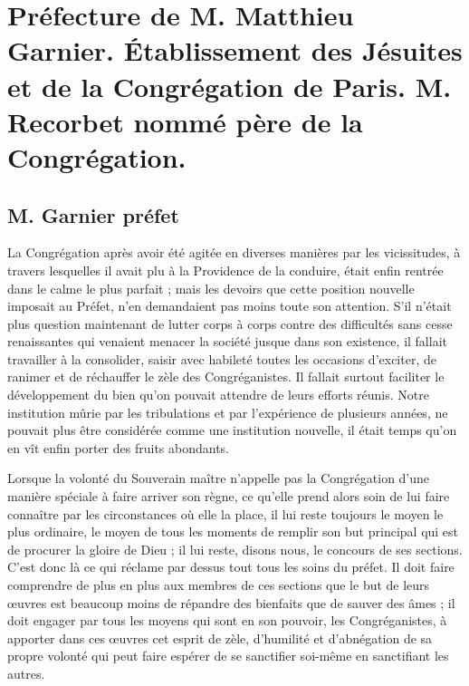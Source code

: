 \chapter{Préfecture de M. Matthieu Garnier. Établissement des Jésuites et de la Congrégation de Paris. M. Recorbet nommé père de la Congrégation.}

\section*{M. Garnier préfet}
La Congrégation après avoir été agitée en diverses manières par les vicissitudes, à travers lesquelles il avait plu à la Providence de la conduire, était enfin rentrée dans le calme le plus parfait ; mais les devoirs que cette position nouvelle imposait au Préfet, n'en demandaient pas moins toute son attention. S'il n'était plus question maintenant de lutter corps à corps contre des difficultés sans cesse renaissantes qui venaient menacer la société jusque dans son existence, il fallait travailler à la consolider, saisir avec habileté toutes les occasions d'exciter, de ranimer et de réchauffer le zèle des Congréganistes. Il fallait surtout faciliter le développement du bien qu'on pouvait attendre de leurs efforts réunis. Notre institution mûrie par les tribulations et par l'expérience de plusieurs années, ne pouvait plus être considérée comme une institution nouvelle, il était temps qu'on en vît enfin porter des fruits abondants.

Lorsque la volonté du Souverain maître n'appelle pas la Congrégation d'une manière spéciale à faire arriver son règne, ce qu'elle prend alors soin de lui faire connaître
par les circonstances où elle la place, il lui reste toujours le moyen le plus ordinaire, le moyen de tous les moments de remplir son but principal qui est de procurer la gloire de Dieu ; il lui reste, disons nous, le concours de ses sections. C'est donc là ce qui réclame par dessus tout tous les soins du préfet. Il doit faire comprendre de plus en plus aux membres de ces sections que le but de leurs œuvres est beaucoup moins de répandre des bienfaits que de sauver des âmes ; il doit engager par tous les moyens qui sont en son pouvoir, les Congréganistes, à apporter dans ces œuvres cet esprit de zèle, d'humilité et d'abnégation de sa propre volonté qui peut faire espérer de se sanctifier soi-même en sanctifiant les autres.

